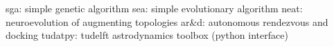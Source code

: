 sga: simple genetic algorithm
sea: simple evolutionary algorithm
neat: neuroevolution of augmenting topologies
ar\&d: autonomous rendezvous and docking
tudatpy: tudelft astrodynamics toolbox (python interface)
